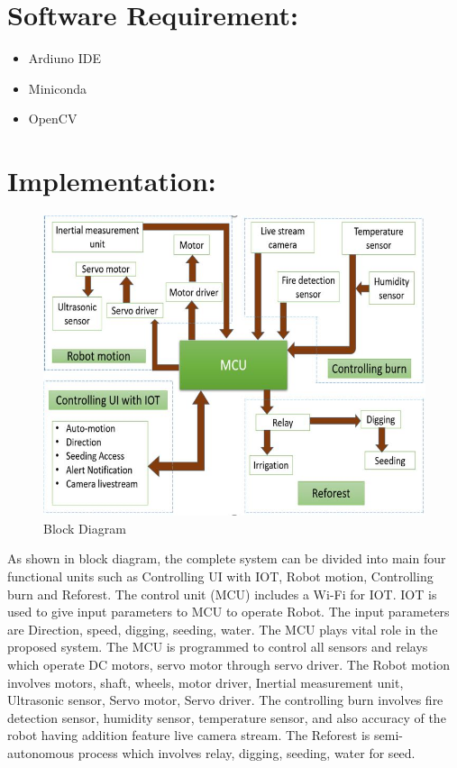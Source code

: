 \documentclass{report}
\begin{document}
\section{Software Requirement:}
\begin{itemize}
	\item Ardiuno IDE
	\item Miniconda
	\item OpenCV
\end{itemize}

\section{Implementation:}

\begin{figure}
	\centering
	\includegraphics{implementation1.jpg}
	\caption{Block Diagram}
	\label{image_1} %
\end{figure}

As shown in block diagram, the complete system can be divided into main four functional units such as Controlling UI with IOT, Robot motion, Controlling burn and Reforest.
The control unit (MCU) includes a Wi-Fi for IOT. IOT is used to give input parameters to MCU to operate Robot. The input parameters are Direction, speed, digging, seeding, water. The MCU plays vital role in the proposed system. The MCU is programmed to control all sensors and relays which operate DC motors, servo motor through servo driver.
The Robot motion involves motors, shaft, wheels, motor driver, Inertial measurement unit, Ultrasonic sensor, Servo motor, Servo driver.
The controlling burn involves fire detection sensor, humidity sensor, temperature sensor, and also accuracy of the robot having addition feature live camera stream. 
The Reforest is semi-autonomous process which involves relay, digging, seeding, water for seed.
\end{document}
